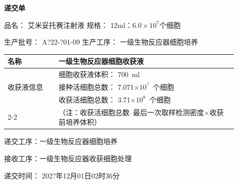 \documentclass[UTF8,10pt,a4paper,fontset=fandol]{ctexart}
\newcommand{\fieldvalue}[1]{#1}
\newcommand{\handwritten}[1]{#1}
\begin{document}
\begin{center}
\textbf{递交单}
\end{center}

\noindent
品名：
\fieldvalue{艾米妥托赛注射液}
\hfill
规格：
\fieldvalue{12ml：$6.0\times10^{7}$个细胞}

\noindent
生产批号：
\fieldvalue{\handwritten{A?22-?01-09}}
\hfill
生产工序：
\fieldvalue{一级生物反应器细胞培养}

\vspace{0.5em}

\begin{center}
\begin{tabular}{|p{0.20\linewidth}|p{0.70\linewidth}|}
\hline
名称 &
\fieldvalue{一级生物反应器细胞收获液}
\\
\hline
\multirow{3}{*}{收获液信息}
&
细胞收获液体积：
\fieldvalue{\handwritten{700}}\ ml
\\
&
接种活细胞总数：
\fieldvalue{\handwritten{7.071$\times10^{?}$}}\ 个细胞
\\
&
收获活细胞总数：
\fieldvalue{\handwritten{3.71$\times10^{8}$}}\ 个细胞
\\
\cline{2-2}
&
\footnotesize（注：收获活细胞总数--最后一次取样检测密度$\times$收获前培养体积）
\\
\hline
\end{tabular}
\end{center}

\noindent
递交工序：一级生物反应器细胞培养

\vspace{0.5em}

\noindent
接收工序：一级生物反应器收获细胞处理

\vspace{0.5em}

\noindent
递交时间：
\fieldvalue{\handwritten{202?年12月01日02时36分}}
\end{document}
